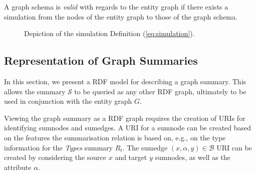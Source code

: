 A graph schema is \emph{valid} with regards to the entity graph if there exists a simulation from the nodes of the entity graph to those of the graph schema.

\begin{figure}
	\centering
	
	\caption{Depiction of the simulation Definition (\ref{eq:simulation}).}
	\label{fig:simulation}
\end{figure}

%
%

\subsection{Representation of Graph Summaries}
\label{chap03:summary-rdf}

In this section, we present a RDF model for describing a graph summary. This allows the summary $\mathcal{S}$ to be queried as any other RDF graph, ultimately to be used in conjunction with the entity graph $G$.

Viewing the graph summary as a RDF graph requires the creation of URIs for identifying sumnodes and sumedges. A URI for a sumnode can be created based on the features the summarisation relation is based on, e.g., on the type information for the \emph{Types} summary $R_t$. The sumedge $(x, \alpha, y) \in \mathcal{B}$ URI can be created by considering the source $x$ and target $y$ sumnodes, as well as the attribute $\alpha$.


